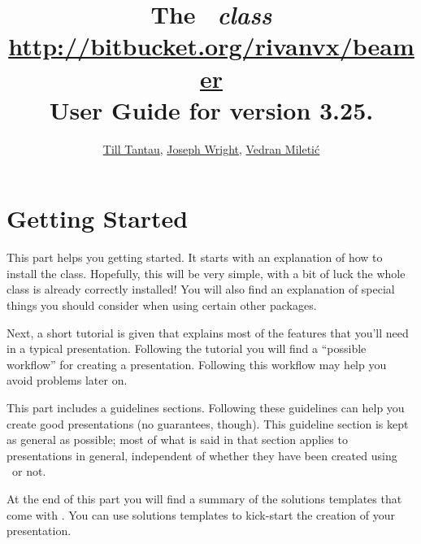 \documentclass{ltxdoc}
\def\beamerugversion{3.25}
\begin{document}

\title{\Huge The \beamer\ \textit{class}\\
\Large\url{http://bitbucket.org/rivanvx/beamer}\\
\Large User Guide for version \beamerugversion.}
\author{\href{mailto:tantau@users.sourceforge.net}{Till Tantau}, \href{mailto:joseph.wright@morningstar2.co.uk}{Joseph Wright}, \href{mailto:vmiletic@inf.uniri.hr}{Vedran Mileti\'c}}

\maketitle

\tableofcontents






\part{Getting Started}

This part helps you getting started. It starts with an explanation of how to install the class. Hopefully, this will be very simple, with a bit of luck the whole class is already correctly installed! You will also find an explanation of special things you should consider when using certain other packages.

Next, a short tutorial is given that explains most of the features that you'll need in a typical presentation. Following the tutorial you will find a ``possible workflow'' for creating a presentation. Following this workflow may help you avoid problems later on.

This part includes a guidelines sections. Following these guidelines can help you create good presentations (no guarantees, though). This guideline section is kept as general as possible; most of what is said in that section applies to presentations in general, independent of whether they have been created using \beamer\ or not.

At the end of this part you will find a summary of the solutions templates that come with \beamer. You can use solutions templates to kick-start the creation of your presentation.
\end{document}
